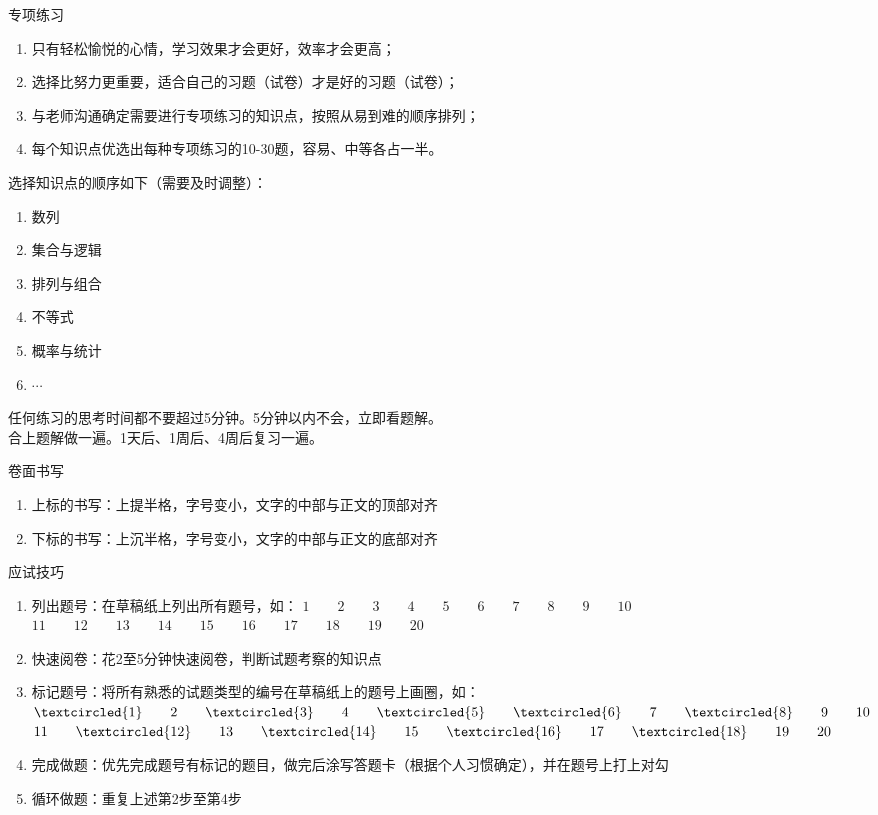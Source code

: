 \documentclass[aspectratio=169]{ctexbeamer} %
\begin{document}
\begin{frame}[t]{专项练习}
\begin{enumerate}[label={\arabic*.}]
\item 只有轻松愉悦的心情，学习效果才会更好，效率才会更高；
\item 选择比努力更重要，适合自己的习题（试卷）才是好的习题（试卷）；
\item 与老师沟通确定需要进行专项练习的知识点，按照从易到难的顺序排列；
\item 每个知识点优选出每种专项练习的10-30题，容易、中等各占一半。
\end{enumerate}
\alert{选择知识点的顺序如下（需要及时调整）：}
\begin{enumerate}[label={\arabic*.}]
\item 数列
\item 集合与逻辑
\item 排列与组合
\item 不等式
\item 概率与统计
\item $\cdots$
\end{enumerate}
\alert{任何练习的思考时间都不要超过5分钟。5分钟以内不会，立即看题解。} \\
\alert{合上题解做一遍。1天后、1周后、4周后复习一遍。} \\

\end{frame}

\begin{frame}[t]{卷面书写}
\begin{enumerate}[label={\arabic*.}]
\item 上标的书写：上提半格，字号变小，文字的中部与正文的顶部对齐
\item 下标的书写：上沉半格，字号变小，文字的中部与正文的底部对齐
\end{enumerate}
\end{frame}

\begin{frame}[t]{应试技巧}
\begin{enumerate}[label={\arabic*.}]
\item 列出题号：在草稿纸上列出所有题号，如：
$1 \qquad 2 \qquad 3 \qquad 4 \qquad 5 \qquad 6 \qquad 7 \qquad 8 \qquad 9 \qquad 10$
$11 \qquad 12 \qquad 13 \qquad 14 \qquad 15 \qquad 16 \qquad 17 \qquad 18 \qquad 19 \qquad 20$
\pause
\item 快速阅卷：花2至5分钟快速阅卷，判断试题考察的知识点
\pause
\item 标记题号：将所有熟悉的试题类型的编号在草稿纸上的题号上画圈，如：
$\textcircled{1} \qquad 2 \qquad \textcircled{3} \qquad 4 \qquad \textcircled{5} \qquad \textcircled{6} \qquad 7 \qquad \textcircled{8} \qquad 9 \qquad 10$
$11 \qquad \textcircled{12} \qquad 13 \qquad \textcircled{14} \qquad 15 \qquad \textcircled{16} \qquad 17 \qquad \textcircled{18} \qquad 19 \qquad 20$
\pause
\item 完成做题：优先完成题号有标记的题目，做完后涂写答题卡（根据个人习惯确定），并在题号上打上对勾
\pause
\item 循环做题：重复上述第2步至第4步
\end{enumerate}
\end{frame}
\end{document}
